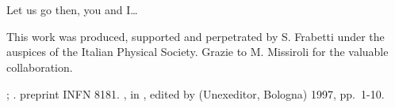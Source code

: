 \documentclass{cimento}
\begin{document}
\appendix

\section{}
Let us go then, you and I\ldots

\acknowledgments
This work was produced, supported and perpetrated by S. Frabetti under
the auspices of the Italian Physical Society.
Grazie to M. Missiroli for the valuable collaboration.

\begin{thebibliography}{0}
 
  ;
  .
 
  preprint INFN 8181.
 
  ,
  in ,
                  edited by 
                  (Unexeditor, Bologna) 1997, pp.~1-10.
\end{thebibliography}
\end{document}
